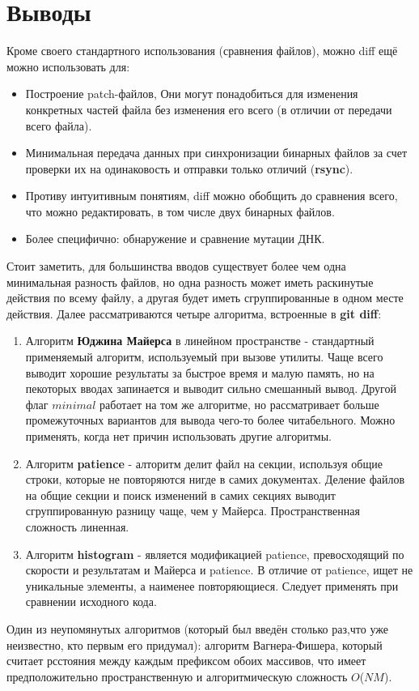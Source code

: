 \section{Выводы}

Кроме своего стандартного использования (сравнения файлов), можно diff ещё можно использовать для:
\begin{itemize}
    \item Построение patch-файлов, Они могут понадобиться для изменения конкретных частей файла без изменения его всего (в отличии от передачи всего файла).
    \item Минимальная передача данных при синхронизации бинарных файлов за счет проверки их на одинаковость и отправки только отличий (\textbf{rsync}).
    \item Противу интуитивным понятиям, diff можно обобщить до сравнения всего, что можно редактировать, в том числе двух бинарных файлов.
    \item Более специфично: обнаружение и сравнение мутации ДНК.
\end{itemize}

Стоит заметить, для большинства вводов существует более чем одна минимальная разность файлов, но одна разность может иметь раскинутые действия по всему файлу, а другая будет иметь сгруппированные в одном месте действия. Далее рассматриваются четыре алгоритма, встроенные в \textbf{git diff}:

\begin{enumerate}
    \item Алгоритм \textbf{Юджина Майерса} в линейном пространстве - стандартный применяемый алгоритм, используемый при вызове утилиты. Чаще всего выводит хорошие результаты за быстрое время и малую память, но на пекоторых вводах запинается и выводит сильно смешанный вывод. Другой флаг $minimal$ работает на том же алгоритме, но рассматривает больше промежуточных вариантов для вывода чего-то более читабельного. Можно применять, когда нет причин использовать другие алгоритмы.
    \item Алгоритм \textbf{patience} - алторитм делит файл на секции, используя общие строки, которые не повторяются нигде в самих документах. Деление файлов на общие секции и поиск изменений в самих секциях выводит сгруппированную разницу чаще, чем у Майерса. Пространственная сложность линенная.
    \item Алгоритм \textbf{histogram} - является модификацией patience, превосходящий по скорости и результатам и Майерса и patience. В отличие от patience, ищет не уникальные элементы, а наименее повторяющиеся. Следует применять при сравнении исходного кода.
\end{enumerate}

Один из неупомянутых алгоритмов (который был введён столько раз,что уже неизвестно, кто первым его придумал): алгоритм Вагнера-Фишера, который считает рсстояния между каждым префиксом обоих массивов, что имеет предположительно пространственную и алгоритмическую сложность $O$($NM$).
